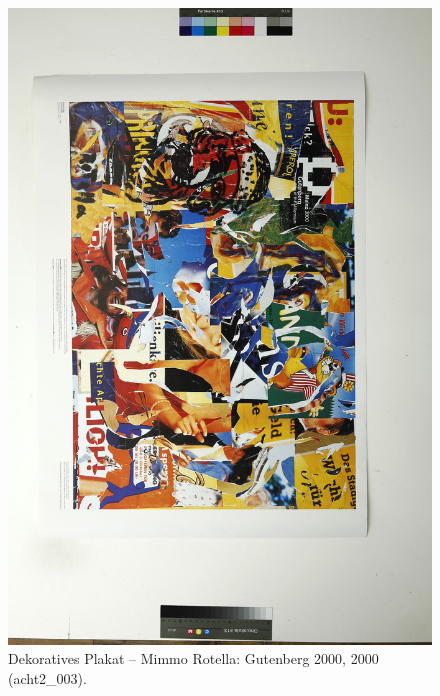 \documentclass[a4paper,12pt,ngerman]{article}
\begin{document}
\newpage
\begin{landscape}
\begin{figure}[ht]
\includegraphics[height=0.85\linewidth, angle=90]{Abbildung_46_(acht2_003)}
\centering
\caption{Dekoratives Plakat – Mimmo Rotella: Gutenberg 2000, 2000 (acht2\_003).}
\end{figure}
\end{landscape}
\end{document}
